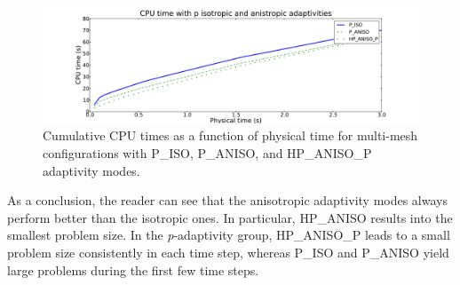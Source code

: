 \begin{figure}[!ht]
  \begin{centering}
  \includegraphics[width=\columnwidth]{isoanisop_cpu}
  \caption{\label{fig:isoanisopcpu} Cumulative CPU times as a function of physical time
  for multi-mesh configurations with P\_ISO, P\_ANISO, and
  HP\_ANISO\_P adaptivity modes.}
  \end{centering}
\end{figure}

As a conclusion, the reader can see that the anisotropic adaptivity modes always perform better than 
the isotropic ones. In particular, HP\_ANISO results into the smallest problem size. 
In the \emph{p}-adaptivity group, HP\_ANISO\_P leads to a small problem size
consistently in each time step, whereas P\_ISO and P\_ANISO yield large problems
during the first few time steps. 

